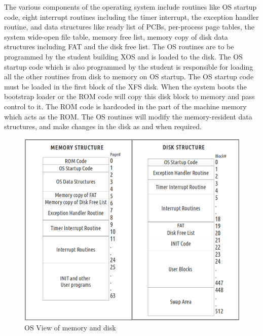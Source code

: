 \documentclass{sig-alternate}
\begin{document}
The various components of the operating system include routines like OS startup code, eight interrupt routines including the timer interrupt, the exception handler routine, and data structures like ready list of PCBs, per-process page tables, the system wide-open file table, memory free list, memory copy of disk data structures including FAT and the disk free list. The OS routines are to be programmed by the student building XOS and is loaded to the disk. The OS startup code which is also programmed by the student is responsible for loading all the other routines from disk to memory on OS startup. The OS startup code must be loaded in the first block of the XFS disk. When the system boots the bootstrap loader or the ROM code will copy this disk block to memory and pass control to it. The ROM code is hardcoded in the part of the machine memory which acts as the ROM. The OS routines will modify the memory-resident data structures, and make changes in the disk as and when required. \\

\begin{figure}[hbtp]
\centering
\includegraphics[scale=0.236]{memdiskstructure.png}
\caption{OS View of memory and disk}
\end{figure}
\end{document}
